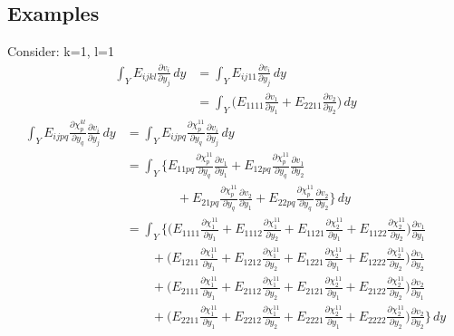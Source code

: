 \documentclass[10pt]{article}
\begin{document}
\subsection{Examples}
Consider: k=1, l=1
\begin{equation}\label{2drhs}
\begin{split}
\int_Y E_{ijkl}\frac{\partial v_i}{\partial y_j}\, dy &=\int_Y E_{ij11}\frac{\partial v_i}{\partial y_j}\,dy\\
&=\int_Y\bigg (E_{1111}\frac{\partial v_1}{\partial y_1}+E_{2211}\frac{\partial v_2}{\partial y_2}\bigg )\, dy
\end{split}
\end{equation}
\begin{equation}\label{2dlhs}
\begin{split}
\int_Y E_{ijpq}\frac{\partial \chi^{kl}_p}{\partial y_q}\frac{\partial v_i}{\partial y_j}\,dy &=\int_Y E_{ijpq}\frac{\partial \chi^{11}_p}{\partial y_q}\frac{\partial v_i}{\partial y_j}\,dy\\
&=\int_Y \bigg \{ E_{11pq}\frac{\partial \chi^{11}_p}{\partial y_q}\frac{\partial v_1}{\partial y_1} + E_{12pq}\frac{\partial \chi^{11}_p}{\partial y_q}\frac{\partial v_1}{\partial y_2}\\
&\qquad\qquad + E_{21pq}\frac{\partial \chi^{11}_p}{\partial y_q}\frac{\partial v_2}{\partial y_1} + E_{22pq}\frac{\partial \chi^{11}_p}{\partial y_q}\frac{\partial v_2}{\partial y_2}\bigg \}\,dy\\
&=\int_Y \bigg \{\bigg ( E_{1111}\frac{\partial \chi^{11}_1}{\partial y_1} + E_{1112}\frac{\partial \chi^{11}_1}{\partial y_2} + E_{1121}\frac{\partial \chi^{11}_2}{\partial y_1} + E_{1122}\frac{\partial \chi^{11}_2}{\partial y_2}\bigg )\frac{\partial v_1}{\partial y_1}\\
&\qquad + \bigg (E_{1211}\frac{\partial \chi^{11}_1}{\partial y_1} + E_{1212}\frac{\partial \chi^{11}_1}{\partial y_2} + E_{1221}\frac{\partial \chi^{11}_2}{\partial y_1} + E_{1222}\frac{\partial \chi^{11}_2}{\partial y_2}\bigg )\frac{\partial v_1}{\partial y_2}\\
&\qquad + \bigg (E_{2111}\frac{\partial \chi^{11}_1}{\partial y_1} + E_{2112}\frac{\partial \chi^{11}_1}{\partial y_2} + E_{2121}\frac{\partial \chi^{11}_2}{\partial y_1} + E_{2122}\frac{\partial \chi^{11}_2}{\partial y_2}\bigg )\frac{\partial v_2}{\partial y_1}\\
&\qquad + \bigg (E_{2211}\frac{\partial \chi^{11}_1}{\partial y_1} + E_{2212}\frac{\partial \chi^{11}_1}{\partial y_2} + E_{2221}\frac{\partial \chi^{11}_2}{\partial y_1} + E_{2222}\frac{\partial \chi^{11}_2}{\partial y_2}\bigg )\frac{\partial v_2}{\partial y_2}\bigg \}\,dy\\

\end{split}
\end{equation}
\end{document}

